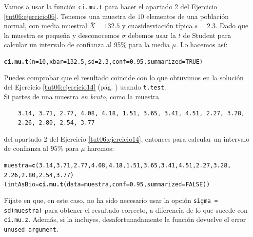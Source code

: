 \documentclass[10pt,a4paper]{article}\usepackage[]{graphicx}\usepackage[]{color}
\makeatletter
\newcommand{\hlnum}[1]{\textcolor[rgb]{0.686,0.059,0.569}{#1}}%
\newcommand{\hlstd}[1]{\textcolor[rgb]{0.345,0.345,0.345}{#1}}%
\newcommand{\hlkwb}[1]{\textcolor[rgb]{0.69,0.353,0.396}{#1}}%
\newcommand{\hlkwc}[1]{\textcolor[rgb]{0.333,0.667,0.333}{#1}}%
\newcommand{\hlkwd}[1]{\textcolor[rgb]{0.737,0.353,0.396}{\textbf{#1}}}%
\newenvironment{kframe}{%
 \def\at@end@of@kframe{}%
 \ifinner\ifhmode%
  \def\at@end@of@kframe{\end{minipage}}%
  \begin{minipage}{\columnwidth}%
 \fi\fi%
 \def\FrameCommand##1{\hskip\@totalleftmargin \hskip-\fboxsep
 \colorbox{shadecolor}{##1}\hskip-\fboxsep
     \hskip-\linewidth \hskip-\@totalleftmargin \hskip\columnwidth}%
 \MakeFramed {\advance\hsize-\width
   \@totalleftmargin\z@ \linewidth\hsize
   \@setminipage}}%
 {\par\unskip\endMakeFramed%
 \at@end@of@kframe}
\newenvironment{knitrout}{}{} %
\newcounter {cont01}
\makeatother
\begin{document}
Vamos a usar la función {\tt ci.mu.t} para hacer el apartado 2 del Ejercicio \ref{tut06:ejercicio06}. Tenemos una muestra de $10$ elementos de una población normal, con media muestral $\bar X=132.5$ y cuasidesviación típica $s=2.3$. Dado que la muestra es pequeña y desconocemos $\sigma$ debemos usar la $t$ de Student para calcular un intervalo  de confianza al 95\% para la media $\mu$. Lo hacemos así:
\begin{knitrout}
\color{fgcolor}\begin{kframe}
\begin{alltt}
\hlkwd{ci.mu.t}\hlstd{(}\hlkwc{n}\hlstd{=}\hlnum{10}\hlstd{,} \hlkwc{xbar}\hlstd{=}\hlnum{132.5}\hlstd{,} \hlkwc{sd}\hlstd{=}\hlnum{2.3}\hlstd{,} \hlkwc{conf}\hlstd{=}\hlnum{0.95}\hlstd{,} \hlkwc{summarized}\hlstd{=}\hlnum{TRUE}\hlstd{)}
\end{alltt}


{\ttfamily\noindent\bfseries{}}\end{kframe}
\end{knitrout}
Puedes comprobar que el resultado coincide con lo que obtuvimos en la solución del Ejercicio \ref{tut06:ejercicio14} (pág. \pageref{tut06:ejercicio14:sol}) usando {\tt t.test}.\\

Si partes de una muestra {\em en bruto}, como la muestra
    \begin{verbatim}
    3.14, 3.71, 2.77, 4.08, 4.18, 1.51, 3.65, 3.41, 4.51, 2.27, 3.28,
    2.26, 2.80, 2.54, 3.77
    \end{verbatim}
del apartado 2 del Ejercicio \ref{tut06:ejercicio14}, entonces para calcular un intervalo de confianza al $95\%$ para $\mu$ haremos:
\begin{knitrout}
\color{fgcolor}\begin{kframe}
\begin{alltt}
\hlstd{muestra} \hlkwb{=} \hlkwd{c}\hlstd{(}\hlnum{3.14}\hlstd{,} \hlnum{3.71}\hlstd{,} \hlnum{2.77}\hlstd{,} \hlnum{4.08}\hlstd{,} \hlnum{4.18}\hlstd{,} \hlnum{1.51}\hlstd{,} \hlnum{3.65}\hlstd{,} \hlnum{3.41}\hlstd{,} \hlnum{4.51}\hlstd{,} \hlnum{2.27}\hlstd{,} \hlnum{3.28}\hlstd{,}
    \hlnum{2.26}\hlstd{,} \hlnum{2.80}\hlstd{,} \hlnum{2.54}\hlstd{,} \hlnum{3.77}\hlstd{)}
\hlstd{(intAsBio} \hlkwb{=} \hlkwd{ci.mu.t}\hlstd{(}\hlkwc{data}\hlstd{=muestra,} \hlkwc{conf}\hlstd{=}\hlnum{0.95}\hlstd{,} \hlkwc{summarized}\hlstd{=}\hlnum{FALSE}\hlstd{))}
\end{alltt}


{\ttfamily\noindent\bfseries{}}\end{kframe}
\end{knitrout}
Fíjate en que, en este caso, no ha sido necesario usar la opción {\tt sigma = sd(muestra)} para obtener el resultado correcto, a diferencia de lo que sucede con {\tt ci.mu.z}. Además, si la incluyes, desafortunadamente la función devuelve el error {\tt unused argument}.
\end{document}

